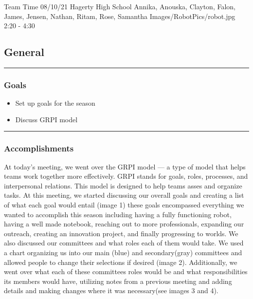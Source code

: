 \insertmeeting 
	{Team Time} 
	{08/10/21}
	{Hagerty High School}
	{Annika, Anouska, Clayton, Falon, James, Jensen, Nathan, Ritam, Rose, Samantha}
	{Images/RobotPics/robot.jpg}
	{2:20 - 4:30}
	
\subsection*{General}
\noindent\hfil\rule{\textwidth}{.4pt}\hfil
\subsubsection*{Goals}
\begin{itemize}
    \item Set up goals for the season
	\item Discuss GRPI model

\end{itemize} 

\noindent\hfil\rule{\textwidth}{.4pt}\hfil

\subsubsection*{Accomplishments}
At today's meeting, we went over the GRPI model --- a type of model that helps teams work together more effectively. GRPI stands for goals, roles, processes, and interpersonal relations. This model is designed to help teams asses and organize tasks. At this meeting, we started discussing our overall goals and creating a list of what each goal would entail (image 1) these goals encompassed everything we wanted to accomplish this season including having a fully functioning robot, having a well made notebook, reaching out to more professionals, expanding our outreach, creating an innovation project, and finally progressing to worlds. 
We also discussed our committees and what roles each of them would take. We used a chart organizing us into our main (blue) and secondary(gray) committees and allowed people to change their selections if desired (image 2). Additionally, we went over what each of these committees roles would be and what responsibilities its members would have, utilizing notes from a previous meeting and adding details and making changes where it was necessary(see images 3 and 4).

